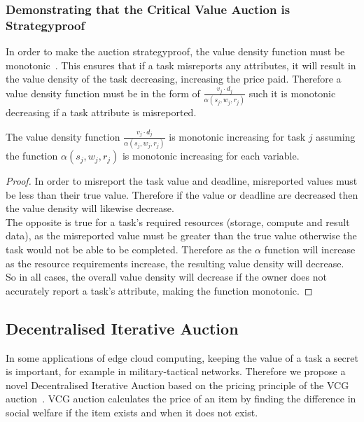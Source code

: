 \subsubsection{Demonstrating that the Critical Value Auction is Strategyproof}
\label{subsubsec:critical-value-auction-strategyproof}
In order to make the auction strategyproof, the value density function must be
monotonic~\cite{nisan2007algorithmic_229_230}. This ensures that if a task misreports any attributes, it will result
in the value density of the task decreasing, increasing the price paid. Therefore a value density function must be in
the form of $\frac{v_j \cdot d_j}{\alpha(s_j, w_j, r_j)}$ such it is monotonic decreasing if a task attribute is
misreported.
\begin{theorem}
    The value density function $\frac{v_j \cdot d_j}{\alpha(s_j, w_j, r_j)}$ is monotonic increasing for task $j$
    assuming the function $\alpha(s_j, w_j, r_j)$ is monotonic increasing for each variable.
\end{theorem}
\begin{proof}
    In order to misreport the task value and deadline, misreported values must be less than their true value. Therefore
    if the value or deadline are decreased then the value density will likewise decrease. \\
    The opposite is true for a task's required resources (storage, compute and result data), as the misreported value
    must be greater than the true value otherwise the task would not be able to be completed. Therefore as the $\alpha$
    function will increase as the resource requirements increase, the resulting value density will decrease. \\
    So in all cases, the overall value density will decrease if the owner does not accurately report a task's attribute,
    making the function monotonic.
\end{proof}

\subsection{Decentralised Iterative Auction}
\label{subsec:decentralised-iterative-auction}
In some applications of edge cloud computing, keeping the value of a task a secret is important, for example in
military-tactical networks. Therefore we propose a novel Decentralised Iterative Auction based on the pricing principle
of the VCG auction~\cite{vickrey,Clarke,groves}. VCG auction calculates the price of an item by finding the
difference in social welfare if the item exists and when it does not exist.

